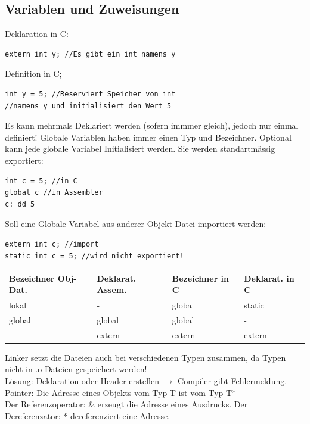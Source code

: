\documentclass[8pt,landscape,a4paper]{scrartcl}
\newcommand{\drule}[3][0]{%
	\tikz[baseline]{\path[decoration={markings,
			mark=between positions 0 and 1 step 2*#3
			with {\node[fill, circle, minimum width=#3, inner sep=0pt, anchor=south west] {};}},postaction={decorate}]  (0,#1) -- ++(#2,0);}}
\begin{document}
\begin{multicols*}{5}
\columnbreak



\section{Variablen und Zuweisungen}
\textcolor{b}{Deklaration} in C:
\begin{lstlisting}
extern int y; //Es gibt ein int namens y
\end{lstlisting}
\textcolor{b}{Definition} in C;
\begin{lstlisting}
int y = 5; //Reserviert Speicher von int 
//namens y und initialisiert den Wert 5
\end{lstlisting}
Es kann mehrmals Deklariert werden (sofern immmer gleich), jedoch nur einmal definiert!
\drule{5.5cm}{1pt}
\textcolor{b}{Globale Variablen} haben immer einen Typ und Bezeichner. Optional kann jede globale Variabel Initialisiert werden. Sie werden standartmässig exportiert:
\begin{lstlisting}
int c = 5; //in C
global c //in Assembler
c: dd 5 
\end{lstlisting}
Soll eine Globale Variabel aus anderer Objekt-Datei importiert werden:
\begin{lstlisting}
extern int c; //import 
static int c = 5; //wird nicht exportiert!
\end{lstlisting}
\vspace{-8pt}
\begin{center}
	\begin{tabular}{p{1.1cm}p{0.9cm}|p{1cm}p{0.9cm}}
		Bezeichner Obj-Dat. & Deklarat. Assem. & Bezeichner in C & Deklarat. in C\\
		\hline
		lokal & - & global & static\\
		global & global & global & -\\
		- & extern & extern & extern\\
	\end{tabular}
\end{center}
Linker setzt die Dateien auch bei verschiedenen Typen zusammen, da Typen nicht in .o-Dateien gespeichert werden!\\
Lösung: \textcolor{b}{Deklaration} oder \textcolor{b}{Header} erstellen $\rightarrow$ Compiler gibt Fehlermeldung.
\drule{5.5cm}{1pt}
\textcolor{b}{Pointer:} Die Adresse eines Objekts vom Typ T ist vom Typ T*\\
Der \textcolor{b}{Referenzoperator:} \& erzeugt die Adresse eines Ausdrucks.
Der \textcolor{b}{Dereferenzator:} * dereferenziert eine Adresse.
\vspace{-4pt}

\end{multicols*}
\end{document}
